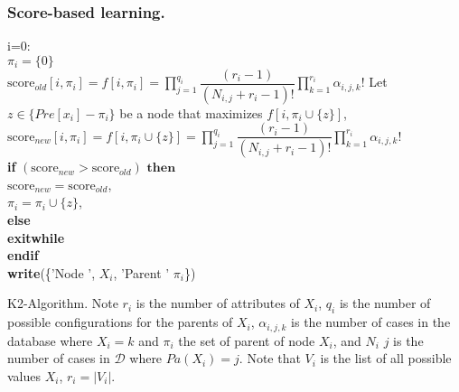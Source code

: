 \documentclass[7pt]{article}
\begin{document}
\subsubsection{Score-based  learning.}
\begin{algorithm}
	\vspace{0.1in}
i=0:\\
			{
			$\pi_i = \{0\}$\\
			$\text{score}_{old} [i,\pi_i]= f[i,\pi_i ] = \prod_{j=1}^{q_i} \dfrac{(r_i - 1)}{(N_{i,j}+r_i - 1)!} 	\prod_{k=1}^{r_i}  \alpha_{i,j,k}!$
			}
		{
			Let $z \in \{Pre[x_i] - \pi_i\}$ be a node that maximizes $f[i,\pi_i \cup \{z\}]$, \\
				\hspace{0.1in} $\text{score}_{new} [i,\pi_i]= f[i,\pi_i \cup \{z\} ] = \prod_{j=1}^{q_i} \dfrac{(r_i - 1)}{(N_{i,j}+r_i - 1)!} 	\prod_{k=1}^{r_i}  \alpha_{i,j,k}!$ \\
			\textbf{if} $(\text{score}_{new} > \text{score}_{old} ) \textbf{ then}$ \\
			\hspace{0.4in}	$\text{score}_{new} = \text{score}_{old}$,\\
			\hspace{0.4in}	$\pi_i = \pi_i \cup \{z\}$,\\
			\textbf{else} \\
			\hspace{0.4in} \textbf{exitwhile} \\
			\textbf{endif} \\
			\textbf{write}(\{'Node ', $X_i$, 'Parent ' $\pi_i$\})
		}
		\caption{K2-Algorithm. Note $r_i$ is the number of attributes of $X_i$, $q_i$ is the number of possible configurations for the parents of $X_i$, $\alpha_{i,j,k}$ is the number of cases in the database where $X_i = k$ and $\pi_i$ the set of parent of node $X_i$, and $N_i$ $j$ is the number of cases in $\mathcal{D}$ where $Pa(X_i) = j$. Note that $V_i$ is the list of all possible values $X_i$, $r_i = |V_i|$.}
\end{algorithm}
\end{document}
